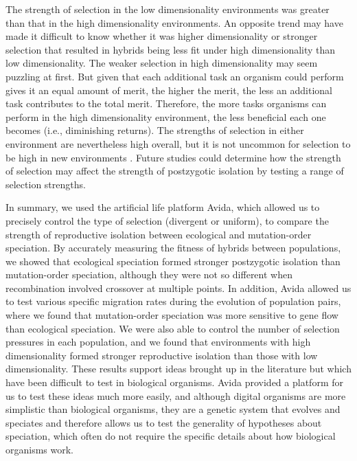 \begin{doublespace}
The strength of selection in the low dimensionality environments
was greater than that in the high dimensionality environments.
%
An opposite trend may have made it difficult to know whether
it was higher dimensionality or stronger selection that resulted
in hybrids being less fit under high dimensionality than low dimensionality.
%
The weaker selection in high dimensionality may seem puzzling at first.
%
But given that each additional task an organism could perform gives it
an equal amount of merit, the higher the merit, the less an additional task
contributes to the total merit.
%
Therefore, the more tasks organisms can perform in the high dimensionality
environment, the less beneficial each one becomes (i.e., diminishing returns).
%
The strengths of selection in either environment are nevertheless high overall,
but it is not uncommon for selection to be high in new environments
\citep[e.g.,][]{len91,det07}.
%
Future studies could determine how the strength of selection may affect
the strength of postzygotic isolation
by testing a range of selection strengths.



In summary, we used the artificial life platform Avida, which allowed us to
precisely control the type of selection (divergent or uniform), to compare the
strength of reproductive isolation between ecological and mutation-order
speciation.
%
By accurately measuring the fitness of hybrids between populations, we showed
that ecological speciation formed stronger postzygotic isolation than
mutation-order speciation, although they were not so different when
recombination involved crossover at multiple points.
%
In addition, Avida allowed us to test various specific migration rates during
the evolution of population pairs, where we found that mutation-order
speciation was more sensitive to gene flow than ecological speciation.
%
We were also able to control the number of selection pressures in each
population, and we found that environments with high dimensionality formed
stronger reproductive isolation than those with low dimensionality.
%
These results support ideas brought up in the literature but which have been
difficult to test in biological organisms.
%
Avida provided a platform for us to test these ideas much more easily, and
although digital organisms are more simplistic than biological organisms, they
are a genetic system that evolves and speciates and therefore allows us to test
the generality of hypotheses about speciation, which often do not require the
specific details about how biological organisms work.




\end{doublespace}
